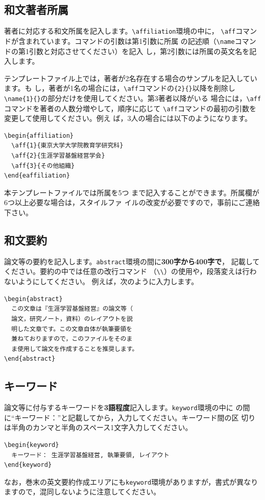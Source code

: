 \documentclass[b5paper,10pt,twocolumn,tombow]{jarticle}
\begin{document}
\subsection{和文著者所属}
著者に対応する和文所属を記入します。\verb|\affiliation|環境の中に，
\verb|\aff|コマンドが含まれています。コマンドの引数は第1引数に所属
の記述順（\verb|\name|コマンドの第1引数と対応させてください）を記入
し，第2引数には所属の英文名を記入します。


テンプレートファイル上では，著者が2名存在する場合のサンプルを記入しています。も
し，著者が1名の場合には，\verb|\aff|コマンドの\verb|{2}{}|以降を削除し
\verb|\name{1}{}|の部分だけを使用してください。第3著者以降がいる
場合には，\verb|\aff|コマンドを著者の人数分増やして，順序に応じて
\verb|\aff|コマンドの最初の引数を変更して使用してください。例え
ば，3人の場合には以下のようになります。

\begin{verbatim}
\begin{affiliation}
  \aff{1}{東京大学大学院教育学研究科}
  \aff{2}{生涯学習基盤経営学会}
  \aff{3}{その他組織}
\end{eaffiliation}
\end{verbatim}

本テンプレートファイルでは所属を5つ
まで記入することができます。所属欄が6つ以上必要な場合は，スタイルファ
イルの改変が必要ですので，事前にご連絡下さい。


\subsection{和文要約}
論文等の要約を記入します。\texttt{abstract}環境の間に\textbf{300字から400字で}，
記載してください。要約の中では任意の改行コマンド
（\verb|\\|）の使用や，段落変えは行わないようにしてください。
例えば，次のように入力します。
\begin{verbatim}
\begin{abstract}
  この文章は『生涯学習基盤経営』の論文等（
  論文，研究ノート，資料）のレイアウトを説
  明した文章です。この文章自体が執筆要領を
  兼ねておりますので，このファイルをそのま
  ま使用して論文を作成することを推奨します。
\end{abstract}
\end{verbatim}


\subsection{キーワード}
論文等に付与するキーワードを\textbf{3語程度}記入します。\texttt{keyword}環境の中に
の間に``キーワード：''と記載してから，入力してください。キーワード間の区
切りは半角のカンマと半角のスペース1文字入力してください。
\begin{verbatim}
\begin{keyword}
  キーワード： 生涯学習基盤経営, 執筆要領, レイアウト
\end{keyword}
\end{verbatim}
なお，巻末の英文要約作成エリアにも\texttt{keyword}環境がありますが，書式が異なり
ますので，混同しないように注意してください。
\end{document}
